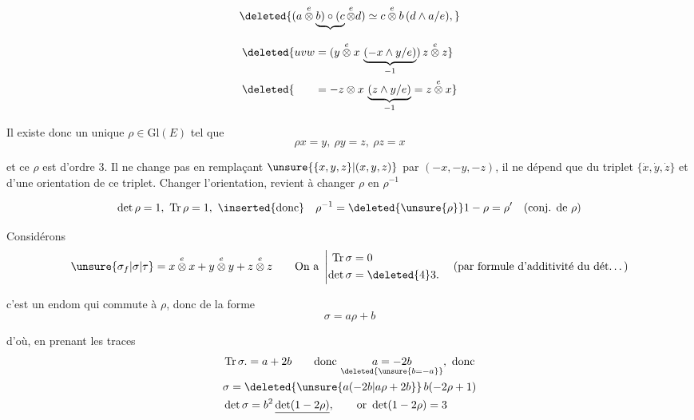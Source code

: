 \[
 \deleted{(a\overset{e}{\otimes}\underbrace{b)\circ(c}\overset{e}{\otimes}d)
 \simeq c\overset{e}{\otimes}b\,(d\wedge a/e),}
\]

\[
\begin{aligned}
 &\deleted{uvw=(y\overset{e}{\otimes}x\,\underbrace{(-x\wedge y/e)}_{-1})\,z\overset{e}{\otimes}z}\\
 &\deleted{\phantom{uvw}=-z\otimes x\,\underbrace{(z\wedge y/e)}_{-1}=z\overset{e}{\otimes}x}
\end{aligned}
\]

Il existe donc un unique $\rho\in\mathrm{Gl}(E)$ tel que
\[
 \rho x=y,\ \rho y=z,\ \rho z=x
\]

et ce $\rho$ est d'ordre 3. Il ne change pas en remplaçant $\unsure{\{x,y,z\}|(x,y,z)}$ par $(-x,-y,-z)$, il ne dépend que du triplet $\{\dot{x},\dot{y},\dot{z}\}$ et d'une orientation de ce triplet. Changer l'orientation, revient à changer $\rho$ en $\rho^{-1}$

\[
 \det\rho=1,\ \operatorname{Tr}\rho=1,\ \inserted{\text{donc}}\quad
 \rho^{-1}=\deleted{\unsure{\rho}}1-\rho=\rho'\quad(\text{conj. de }\rho)
\]

Considérons
\[
 \unsure{\sigma_f|\sigma|\tau} =x\overset{e}{\otimes}x+y\overset{e}{\otimes}y+z\overset{e}{\otimes}z
 \qquad\text{On a }\left|\begin{aligned}
 \operatorname{Tr}\sigma&=0\\
 \det\sigma&=\deleted{4}3.
 \end{aligned}\right.\quad
 \text{(par formule d'additivité du dét\ldots)}
\]

c'est un endom qui commute à $\rho$, donc de la forme
\[
 \sigma=a\rho+b
\]

 d'où, en prenant les traces
\[
\begin{aligned}
 &\operatorname{Tr}\sigma.=a+2b\qquad\text{donc }\underset{\deleted{\unsure{b=-a}}}{a=-2b},\ \text{donc}\\
 &\sigma=\deleted{\unsure{a(-2b|a\rho+2b}}\,b(-2\rho+1)\\
 &\det\sigma=b^2\,\underline{\det(1-2\rho)},\qquad \text{or }\det(1-2\rho)=3
\end{aligned}
\]

